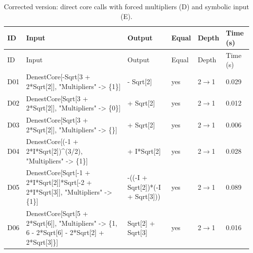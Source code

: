 \begin{longtable}{@{}p{}>{\ttfamily\footnotesize\raggedright\arraybackslash}p{}>{\ttfamily\footnotesize\raggedright\arraybackslash}p{}p{}p{}p{}@{}}
\caption{Corrected version: direct core calls with forced multipliers (D) and symbolic input (E).}\label{tab:fixedDE}\\
\toprule ID & Input & Output & Equal & Depth & Time (s)\\\midrule\endfirsthead
\toprule ID & Input & Output & Equal & Depth & Time (s)\\\midrule\endhead
\bottomrule\endfoot
D01 & DenestCore[\allowbreak{}-Sqrt[\allowbreak{}3 +\allowbreak{} 2*\allowbreak{}Sqrt[\allowbreak{}2]\allowbreak{}]\allowbreak{},\allowbreak{} "Multipliers" -> \{1\}]\allowbreak{} & -1 -\allowbreak{} Sqrt[\allowbreak{}2]\allowbreak{} & yes & 2$\to$1 & 0.029\\
D02 & DenestCore[\allowbreak{}Sqrt[\allowbreak{}3 +\allowbreak{} 2*\allowbreak{}Sqrt[\allowbreak{}2]\allowbreak{}]\allowbreak{},\allowbreak{} "Multipliers" -> \{0\}]\allowbreak{} & 1 +\allowbreak{} Sqrt[\allowbreak{}2]\allowbreak{} & yes & 2$\to$1 & 0.012\\
D03 & DenestCore[\allowbreak{}Sqrt[\allowbreak{}3 +\allowbreak{} 2*\allowbreak{}Sqrt[\allowbreak{}2]\allowbreak{}]\allowbreak{},\allowbreak{} "Multipliers" -> \{\}]\allowbreak{} & 1 +\allowbreak{} Sqrt[\allowbreak{}2]\allowbreak{} & yes & 2$\to$1 & 0.006\\
D04 & DenestCore[\allowbreak{}(\allowbreak{}-1 +\allowbreak{} 2*\allowbreak{}I*\allowbreak{}Sqrt[\allowbreak{}2]\allowbreak{})\allowbreak{}\textasciicircum{}\allowbreak{}(\allowbreak{}3/\allowbreak{}2)\allowbreak{},\allowbreak{} "Multipliers" -> \{1\}]\allowbreak{} & -5 +\allowbreak{} I*\allowbreak{}Sqrt[\allowbreak{}2]\allowbreak{} & yes & 2$\to$1 & 0.028\\
D05 & DenestCore[\allowbreak{}Sqrt[\allowbreak{}-1 +\allowbreak{} 2*\allowbreak{}I*\allowbreak{}Sqrt[\allowbreak{}2]\allowbreak{}]\allowbreak{}*\allowbreak{}Sqrt[\allowbreak{}-2 +\allowbreak{} 2*\allowbreak{}I*\allowbreak{}Sqrt[\allowbreak{}3]\allowbreak{}]\allowbreak{},\allowbreak{} "Multipliers" -> \{1\}]\allowbreak{} & -(\allowbreak{}(\allowbreak{}-I +\allowbreak{} Sqrt[\allowbreak{}2]\allowbreak{})\allowbreak{}*\allowbreak{}(\allowbreak{}-I +\allowbreak{} Sqrt[\allowbreak{}3]\allowbreak{})\allowbreak{})\allowbreak{} & yes & 2$\to$1 & 0.089\\
D06 & DenestCore[\allowbreak{}Sqrt[\allowbreak{}5 +\allowbreak{} 2*\allowbreak{}Sqrt[\allowbreak{}6]\allowbreak{}]\allowbreak{},\allowbreak{} "Multipliers" -> \{1,\allowbreak{} 6 -\allowbreak{} 2*\allowbreak{}Sqrt[\allowbreak{}6]\allowbreak{} -\allowbreak{} 2*\allowbreak{}Sqrt[\allowbreak{}2]\allowbreak{} +\allowbreak{} 2*\allowbreak{}Sqrt[\allowbreak{}3]\allowbreak{}\}]\allowbreak{} & Sqrt[\allowbreak{}2]\allowbreak{} +\allowbreak{} Sqrt[\allowbreak{}3]\allowbreak{} & yes & 2$\to$1 & 0.016\\

\end{longtable}
